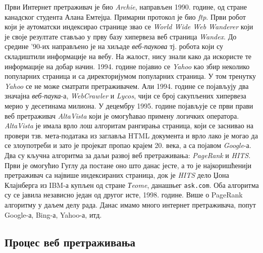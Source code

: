 \documentclass[11pt, serbianc, english, titlepage]{article}
\begin{document}
Први Интернет претраживач је био \emph{Archie}, направљен 1990. године, од стране канадског студента Алана Емтејџа. Примарни протокол је био \emph{ftp}. Први робот који је аутоматски индексирао странице звао се \emph{World Wide Web Wanderer} који је своје резултате стављао у прву базу хипервеза веб страница \emph{Wandex}. До средине '90-их направљено је на хиљаде \emph{веб-паукова} тј. робота који су складиштили информације на вебу. На жалост, нису знали како да искористе те информације на добар начин. 1994. године појавио се \emph{Yahoo} као збир неколико популарних страница и са директоријумом популарних страница. У том тренутку \emph{Yahoo} се не може сматрати претраживачем. Али 1994. године се појављују два значајна \emph{веб-паука}-а, \emph{WebCrawler} и \emph{Lycos}, чији се број сакупљених хипервеза мерио у десетинама милиона. У децембру 1995. године појављује се први прави веб претраживач \emph{AltaVista} који је омогућавао примену логичких оператора. \emph{AltaVista} је имала врло лош алгоритам рангирања страница, који се заснивао на провери тзв. мета-података из заглавља HTML документа и врло лако је могао да се злоупотреби и зато је пројекат пропао крајем 20. века, а са појавом \emph{Google}-а. Два су кључна алгоритма за даљи развој веб претраживања: \emph{PageRank} и \emph{HITS}. Први је омогућио Гуглу да постане оно што данас јесте, а то је најкоришћенији претраживач са највише индексираних страница, док је \emph{HITS} дело Џона Клајнберга из IBM-а купљен од стране \emph{Тeome}, данашњег \texttt{ask.com}. Оба алгоритма су се јавила независно један од другог исте, 1998. године. Више о PageRank алгоритму у даљем делу рада. Данас имамо много интернет претраживача, попут Google-а, Bing-а, Yahoo-а, итд. \\
\subsection{Процес веб претраживања}\label{subsec:web}
\end{document}
